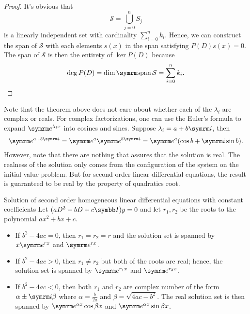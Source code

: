 \begin{proof}
  It's obvious that
  \begin{equation}
    \mathcal{S} = \bigcup_{j=0}^{n} S_j
  \end{equation}
  is a linearly independent set with cardinality \(\sum_{i=0}^n k_i\). Hence, we can
  construct the span of \(\mathcal{S}\) with each elements \(s(x)\) in the span satisfying
  \(P(D)s(x) = 0\). The span of \(\mathcal{S}\) is then the entirety of \(\ker P(D)\) because
  \begin{equation}
    \deg P(D) = \dim \spn \mathcal{S} = \sum_{i=0}^n k_i.
  \end{equation}
\end{proof}

Note that the theorem above does not care about whether each of the \(\lambda_i\) are
complex or reals. For complex factorizations, one can use the Euler's formula to expand
\(\e^{\lambda_i x}\) into cosines and sines. Suppose \(\lambda_i = a + b\im\), then
\begin{equation}
  \e^{a+b\im} = \e^a \e^{b\im} = \e^a (\cos b + \im \sin b).
\end{equation}
However, note that there are nothing that assures that the solution is real. The realness
of the solution only comes from the configuration of the system on the initial value
problem. But for second order linear differential equations, the result is guaranteed
to be real by the property of quadratics root.

\begin{cor}{Solution of second order homogeneous linear differential equations with constant coefficients}{}
  Let \((aD^2 + bD + c\iden)y = 0\) and let \(r_1, r_2\) be the roots to the polynomial
  \(ax^2 + bx + c\).
  \begin{itemize}
    \item If \(b^2 - 4ac = 0\), then \(r_1 = r_2 = r\) and the solution set is spanned
          by \(x \e^{rx}\) and \(\e^{rx}\).
    \item If \(b^2 - 4ac > 0\), then \(r_1 \neq r_2\) but both of the roots are real;
          hence, the solution set is spanned by \(\e^{r_1x}\) and \(\e^{r_2x}\).
    \item If \(b^2 - 4ac < 0\), then both \(r_1\) and \(r_2\) are complex number of
          the form \(\alpha \pm \im \beta\) where \(\alpha = \frac{b}{2a}\) and
          \(\beta = \sqrt{4ac - b^2}\). The real solution set is then spanned by
          \(\e^{\alpha x} \cos \beta x\) and \(\e^{\alpha x} \sin \beta x\).
  \end{itemize}
\end{cor}

